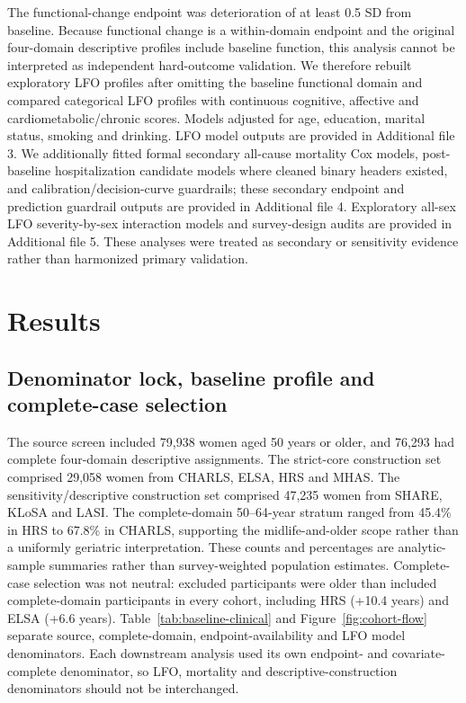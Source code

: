 \documentclass[pdflatex,sn-vancouver-num]{sn-jnl}
\begin{document}
The functional-change endpoint was deterioration of at least 0.5 SD from baseline. Because functional change is a within-domain endpoint and the original four-domain descriptive profiles include baseline function, this analysis cannot be interpreted as independent hard-outcome validation. We therefore rebuilt exploratory LFO profiles after omitting the baseline functional domain and compared categorical LFO profiles with continuous cognitive, affective and cardiometabolic/chronic scores. Models adjusted for age, education, marital status, smoking and drinking. LFO model outputs are provided in Additional file 3. We additionally fitted formal secondary all-cause mortality Cox models, post-baseline hospitalization candidate models where cleaned binary headers existed, and calibration/decision-curve guardrails; these secondary endpoint and prediction guardrail outputs are provided in Additional file 4. Exploratory all-sex LFO severity-by-sex interaction models and survey-design audits are provided in Additional file 5. These analyses were treated as secondary or sensitivity evidence rather than harmonized primary validation.

\section{Results}\label{sec:results}

\subsection{Denominator lock, baseline profile and complete-case selection}

The source screen included 79,938 women aged 50 years or older, and 76,293 had complete four-domain descriptive assignments. The strict-core construction set comprised 29,058 women from CHARLS, ELSA, HRS and MHAS. The sensitivity/descriptive construction set comprised 47,235 women from SHARE, KLoSA and LASI. The complete-domain 50--64-year stratum ranged from 45.4\% in HRS to 67.8\% in CHARLS, supporting the midlife-and-older scope rather than a uniformly geriatric interpretation. These counts and percentages are analytic-sample summaries rather than survey-weighted population estimates. Complete-case selection was not neutral: excluded participants were older than included complete-domain participants in every cohort, including HRS (+10.4 years) and ELSA (+6.6 years). Table~\ref{tab:baseline-clinical} and Figure~\ref{fig:cohort-flow} separate source, complete-domain, endpoint-availability and LFO model denominators. Each downstream analysis used its own endpoint- and covariate-complete denominator, so LFO, mortality and descriptive-construction denominators should not be interchanged.
\end{document}
